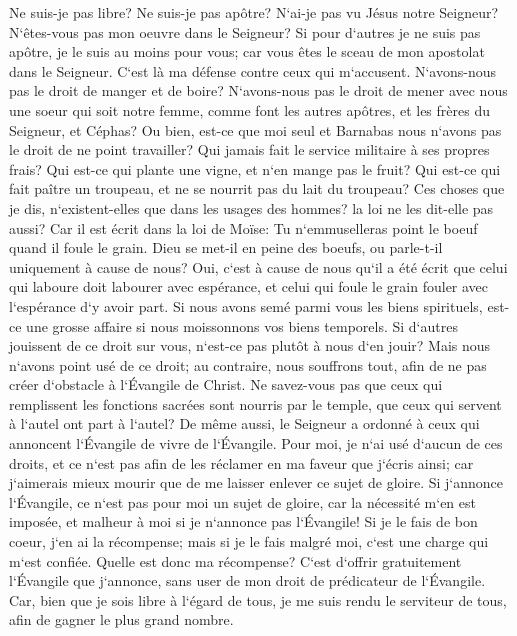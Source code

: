 \verse Ne suis-je pas libre? Ne suis-je pas apôtre? N`ai-je pas vu Jésus notre Seigneur? N`êtes-vous pas mon oeuvre dans le Seigneur? 
\verse Si pour d`autres je ne suis pas apôtre, je le suis au moins pour vous; car vous êtes le sceau de mon apostolat dans le Seigneur. 
\verse C`est là ma défense contre ceux qui m`accusent. 
\verse N`avons-nous pas le droit de manger et de boire? 
\verse N`avons-nous pas le droit de mener avec nous une soeur qui soit notre femme, comme font les autres apôtres, et les frères du Seigneur, et Céphas? 
\verse Ou bien, est-ce que moi seul et Barnabas nous n`avons pas le droit de ne point travailler? 
\verse Qui jamais fait le service militaire à ses propres frais? Qui est-ce qui plante une vigne, et n`en mange pas le fruit? Qui est-ce qui fait paître un troupeau, et ne se nourrit pas du lait du troupeau? 
\verse Ces choses que je dis, n`existent-elles que dans les usages des hommes? la loi ne les dit-elle pas aussi? 
\verse Car il est écrit dans la loi de Moïse: Tu n`emmuselleras point le boeuf quand il foule le grain. Dieu se met-il en peine des boeufs, 
\verse ou parle-t-il uniquement à cause de nous? Oui, c`est à cause de nous qu`il a été écrit que celui qui laboure doit labourer avec espérance, et celui qui foule le grain fouler avec l`espérance d`y avoir part. 
\verse Si nous avons semé parmi vous les biens spirituels, est-ce une grosse affaire si nous moissonnons vos biens temporels. 
\verse Si d`autres jouissent de ce droit sur vous, n`est-ce pas plutôt à nous d`en jouir? Mais nous n`avons point usé de ce droit; au contraire, nous souffrons tout, afin de ne pas créer d`obstacle à l`Évangile de Christ. 
\verse Ne savez-vous pas que ceux qui remplissent les fonctions sacrées sont nourris par le temple, que ceux qui servent à l`autel ont part à l`autel? 
\verse De même aussi, le Seigneur a ordonné à ceux qui annoncent l`Évangile de vivre de l`Évangile. 
\verse Pour moi, je n`ai usé d`aucun de ces droits, et ce n`est pas afin de les réclamer en ma faveur que j`écris ainsi; car j`aimerais mieux mourir que de me laisser enlever ce sujet de gloire. 
\verse Si j`annonce l`Évangile, ce n`est pas pour moi un sujet de gloire, car la nécessité m`en est imposée, et malheur à moi si je n`annonce pas l`Évangile! 
\verse Si je le fais de bon coeur, j`en ai la récompense; mais si je le fais malgré moi, c`est une charge qui m`est confiée. 
\verse Quelle est donc ma récompense? C`est d`offrir gratuitement l`Évangile que j`annonce, sans user de mon droit de prédicateur de l`Évangile. 
\verse Car, bien que je sois libre à l`égard de tous, je me suis rendu le serviteur de tous, afin de gagner le plus grand nombre. 
